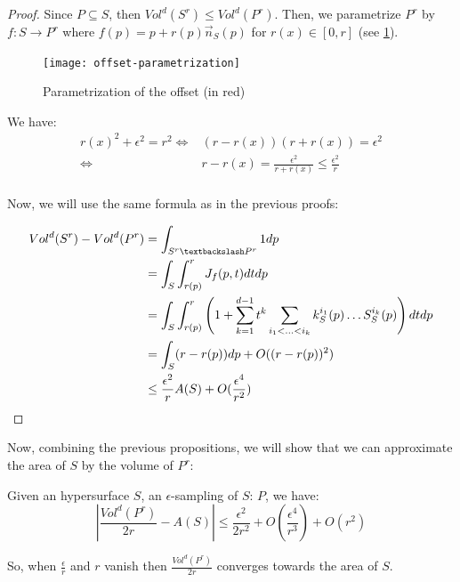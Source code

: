 \begin{proof}
    Since $ P \subseteq S $, then $ Vol^d(S^r) \leq Vol^d(P^r) $. Then, we
    parametrize $ P^r $ by $ f : S \to P^r $ where $ f(p) = p + r(p)
    \vec{n}_S(p) $ for $ r(x) \in [0, r] $ (see
    \ref{fig:offset-parametrization}).

    \begin{figure}[h]
        \centering
        \texttt{[image: offset-parametrization]}
        \caption{Parametrization of the offset (in red)}
        \label{fig:offset-parametrization}
    \end{figure}

    We have:
    \begin{align*}
        r(x)^2 + \epsilon^2 = r^2 \iff& (r - r(x)) (r + r(x)) = \epsilon^2 \\
        \iff& r - r(x) = \frac{\epsilon^2}{r + r(x)} \leq \frac{\epsilon^2}{r} \\
    \end{align*}

    Now, we will use the same formula as in the previous proofs:

    \begin{align*}
        Vol^d(S^r) - Vol^d(P^r) &= \int_{S^r \textbackslash P^r} 1 dp \\
        &= \int_S \int_{r(p)}^r J_f(p, t) dt dp \\
        &= \int_S \int_{r(p)}^r \left( 1 + \sum_{k=1}^{d-1} t^k \sum_{i_1 < \ldots
                < i_k} k^{i_1}_S(p) \ldots S^{i_k}_S(p) \right) dt dp \\
        &= \int_S (r - r(p)) dp + O((r - r(p))^2) \\
        &\leq \frac{\epsilon^2}{r} A(S) + O(\frac{\epsilon^4}{r^2})
    \end{align*}
\end{proof}

Now, combining the previous propositions, we will show that we can approximate
the area of $ S $ by the volume of $ P^r $:

\begin{proposition}
    \label{prop:approx-volume-area}
    Given an hypersurface $ S $, an $\epsilon$-sampling of $ S $: $ P $, we
    have:
    \begin{equation}
        | \frac{Vol^d(P^r)}{2r} - A(S) | \leq \frac{\epsilon^2}{2r^2} +
        O(\frac{\epsilon^4}{r^3}) + O(r^2)
    \end{equation}

    So, when $ \frac{\epsilon}{r} $ and $ r $ vanish then $
    \frac{Vol^d(P^r)}{2r} $ converges towards the area of $ S $.
\end{proposition}

